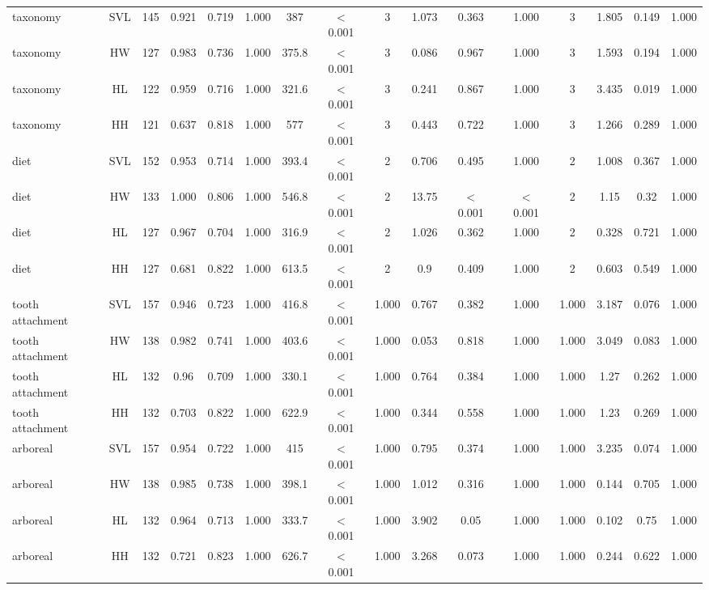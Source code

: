 \begin{longtable}{lccccccccccccccc}
\hline
taxonomy & SVL & 145 & 0.921 & 0.719 & 1.000 & 387 & $<$ 0.001 & 3 & 1.073 & 0.363 & 1.000 & 3 & 1.805 & 0.149 & 1.000 \\ 
taxonomy & HW & 127 & 0.983 & 0.736 & 1.000 & 375.8 & $<$ 0.001 & 3 & 0.086 & 0.967 & 1.000 & 3 & 1.593 & 0.194 & 1.000 \\ 
taxonomy & HL & 122 & 0.959 & 0.716 & 1.000 & 321.6 & $<$ 0.001 & 3 & 0.241 & 0.867 & 1.000 & 3 & 3.435 & 0.019 & 1.000 \\ 
taxonomy & HH & 121 & 0.637 & 0.818 & 1.000 & 577 & $<$ 0.001 & 3 & 0.443 & 0.722 & 1.000 & 3 & 1.266 & 0.289 & 1.000 \\ 
diet & SVL & 152 & 0.953 & 0.714 & 1.000 & 393.4 & $<$ 0.001 & 2 & 0.706 & 0.495 & 1.000 & 2 & 1.008 & 0.367 & 1.000 \\ 
diet & HW & 133 & 1.000 & 0.806 & 1.000 & 546.8 & $<$ 0.001 & 2 & 13.75 & $<$ 0.001 & $<$ 0.001 & 2 & 1.15 & 0.32 & 1.000 \\ 
diet & HL & 127 & 0.967 & 0.704 & 1.000 & 316.9 & $<$ 0.001 & 2 & 1.026 & 0.362 & 1.000 & 2 & 0.328 & 0.721 & 1.000 \\ 
diet & HH & 127 & 0.681 & 0.822 & 1.000 & 613.5 & $<$ 0.001 & 2 & 0.9 & 0.409 & 1.000 & 2 & 0.603 & 0.549 & 1.000 \\ 
tooth attachment & SVL & 157 & 0.946 & 0.723 & 1.000 & 416.8 & $<$ 0.001 & 1.000 & 0.767 & 0.382 & 1.000 & 1.000 & 3.187 & 0.076 & 1.000 \\ 
tooth attachment & HW & 138 & 0.982 & 0.741 & 1.000 & 403.6 & $<$ 0.001 & 1.000 & 0.053 & 0.818 & 1.000 & 1.000 & 3.049 & 0.083 & 1.000 \\ 
tooth attachment & HL & 132 & 0.96 & 0.709 & 1.000 & 330.1 & $<$ 0.001 & 1.000 & 0.764 & 0.384 & 1.000 & 1.000 & 1.27 & 0.262 & 1.000 \\ 
tooth attachment & HH & 132 & 0.703 & 0.822 & 1.000 & 622.9 & $<$ 0.001 & 1.000 & 0.344 & 0.558 & 1.000 & 1.000 & 1.23 & 0.269 & 1.000 \\ 
arboreal & SVL & 157 & 0.954 & 0.722 & 1.000 & 415 & $<$ 0.001 & 1.000 & 0.795 & 0.374 & 1.000 & 1.000 & 3.235 & 0.074 & 1.000 \\ 
arboreal & HW & 138 & 0.985 & 0.738 & 1.000 & 398.1 & $<$ 0.001 & 1.000 & 1.012 & 0.316 & 1.000 & 1.000 & 0.144 & 0.705 & 1.000 \\ 
arboreal & HL & 132 & 0.964 & 0.713 & 1.000 & 333.7 & $<$ 0.001 & 1.000 & 3.902 & 0.05 & 1.000 & 1.000 & 0.102 & 0.75 & 1.000 \\ 
arboreal & HH & 132 & 0.721 & 0.823 & 1.000 & 626.7 & $<$ 0.001 & 1.000 & 3.268 & 0.073 & 1.000 & 1.000 & 0.244 & 0.622 & 1.000 \\ 

\end{longtable}
